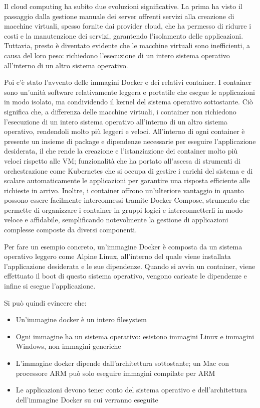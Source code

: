 Il cloud computing ha subito due evoluzioni significative. La prima ha visto il passaggio dalla gestione manuale dei
server offrenti servizi alla creazione di macchine virtuali, spesso fornite dai provider cloud, che ha permesso di
ridurre i costi e la manutenzione dei servizi, garantendo l'isolamento delle applicazioni. Tuttavia, presto è diventato
evidente che le macchine virtuali sono inefficienti, a causa del loro peso: richiedono l'esecuzione di un intero sistema
operativo all'interno di un altro sistema operativo.

Poi c'è stato l'avvento delle immagini Docker e dei relativi container. I container sono un'unità software relativamente
leggera e portatile che esegue le applicazioni in modo isolato, ma condividendo il kernel del sistema operativo
sottostante. Ciò significa che, a differenza delle macchine virtuali, i container non richiedono l'esecuzione di un
intero sistema operativo all'interno di un altro sistema operativo, rendendoli molto più leggeri e veloci. All'interno
di ogni container è presente un insieme di package e dipendenze necessarie per eseguire l'applicazione desiderata, il
che rende la creazione e l'istanziazione dei container molto più veloci rispetto alle VM; funzionalità che ha portato
all'ascesa di strumenti di orchestrazione come Kubernetes che si occupa di gestire i carichi del sistema e di scalare
automaticamente le applicazioni per garantire una risposta efficiente alle richieste in arrivo. Inoltre, i container
offrono un'ulteriore vantaggio in quanto possono essere facilmente interconnessi tramite Docker Compose, strumento che
permette di organizzare i container in gruppi logici e interconnetterli in modo veloce e affidabile, semplificando
notevolmente la gestione di applicazioni complesse composte da diversi componenti.

Per fare un esempio concreto, un'immagine Docker è composta da un sistema operativo leggero come Alpine Linux,
all'interno del quale viene installata l'applicazione desiderata e le sue dipendenze. Quando si avvia un container,
viene effettuato il boot di questo sistema operativo, vengono caricate le dipendenze e infine si esegue l'applicazione.

Si può quindi evincere che:
\begin{itemize}
    \item Un'immagine docker è un intero filesystem
    \item Ogni immagine ha un sistema operativo: esistono immagini Linux e immagini Windows, non immagini generiche
    \item L'immagine docker dipende dall'architettura sottostante; un Mac con processore ARM può solo eseguire immagini
    compilate per ARM
    \item Le applicazioni devono tener conto del sistema operativo e dell'architettura dell'immagine Docker su cui
    verranno eseguite
\end{itemize}

